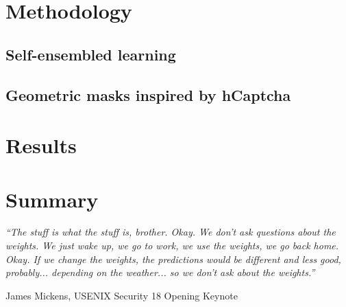 \documentclass[a4paper, oneside]{discothesis}
\begin{document}
\chapter{Methodology}

\section{Self-ensembled learning}

\section{Geometric masks inspired by hCaptcha}

\chapter{Results}




\chapter{Summary}

\begin{flushright}
	\textit{``The stuff is what the stuff is, brother. Okay. We don't ask questions about the weights. We just wake up, we go to work, we use the weights, we go back home. Okay. If we change the weights, the predictions would be different and less good, probably... depending on the weather... so we don't ask about the weights.''}
	
	\textemdash{} James Mickens, USENIX Security 18 Opening Keynote~\cite{218395}
\end{flushright}
\end{document}
